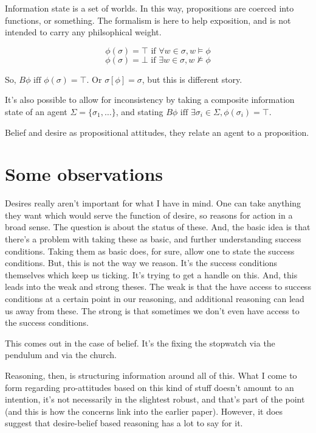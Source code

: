\documentclass[10pt]{article}
\begin{document}
Information state is a set of worlds.
In this way, propositions are coerced into functions, or something.
The formalism is here to help exposition, and is not intended to carry any philsophical weight.

\[\phi(\sigma) = \top \text{ if } \forall w \in \sigma, w \vDash \phi\]
\[\phi(\sigma) = \bot \text{ if } \exists w \in \sigma, w \nvDash \phi\]

So, \(B\phi \text{ iff } \phi(\sigma) = \top\).
Or \(\sigma[\phi] = \sigma\), but this is different story.

It's also possible to allow for inconsistency by taking a composite information state of an agent \(\Sigma = \{\sigma_{1}, \dots\}\), and stating \(B\phi \text{ iff } \exists \sigma_{i} \in \Sigma, \phi(\sigma_{i}) = \top\).





Belief and desire as propositional attitudes, they relate an agent to a proposition.


\section{Some observations}
\label{sec:some-observations}

Desires really aren't important for what I have in mind.
One can take anything they want which would serve the function of desire, so reasons for action in a broad sense.
The question is about the status of these.
And, the basic idea is that there's a problem with taking these as basic, and further understanding success conditions.
Taking them as basic does, for sure, allow one to state the success conditions.
But, this is not the way we reason.
It's the success conditions themselves which keep us ticking.
It's trying to get a handle on this.
And, this leads into the weak and strong theses.
The weak is that the have access to success conditions at a certain point in our reasoning, and additional reasoning can lead us away from these.
The strong is that sometimes we don't even have access to the success conditions.

This comes out in the case of belief.
It's the fixing the stopwatch via the pendulum and via the church.

Reasoning, then, is structuring information around all of this.
What I come to form regarding pro-attitudes based on this kind of stuff doesn't amount to an intention, it's not necessarily in the slightest robust, and that's part of the point (and this is how the concerns link into the earlier paper).
However, it does suggest that desire-belief based reasoning has a lot to say for it.
\end{document}
